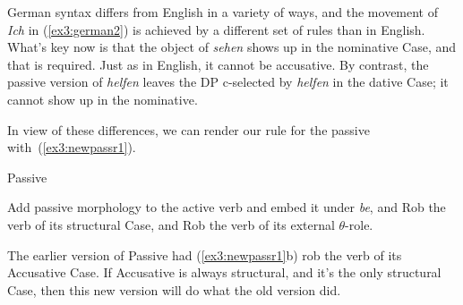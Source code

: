 German syntax differs from English in a variety of ways, and the movement of \emph{Ich} in (\ref{ex3:german2}) is achieved by a different set of rules than in English. What's key now is that the object of \emph{sehen} shows up in the nominative Case, and that is required. Just as in English, it cannot be accusative. By contrast, the passive version of \emph{helfen} leaves the DP c-selected by \emph{helfen} in the dative Case; it cannot show up in the nominative.
\begin{exe}
	\raggedright
	\ex \label{ex3:german3} 
	\begin{xlist}
	\end{xlist}
\end{exe}
\pagebreak

In view of these differences, we can render our rule for the passive with~(\ref{ex3:newpassr1}).
\begin{exe}
	\raggedright
	\ex \label{ex3:newpassr1} Passive
	\begin{xlist}
		\ex Add passive morphology to the active verb and embed it under \emph{be}, and
		\ex Rob the verb of its structural Case, and
		\ex Rob the verb of its external $\theta$-role.
	\end{xlist}
\end{exe}
The earlier version of Passive had (\ref{ex3:newpassr1}b) rob the verb of its Accusative Case. If Accusative is always structural, and it's the only structural Case, then this new version will do what the old version did.

